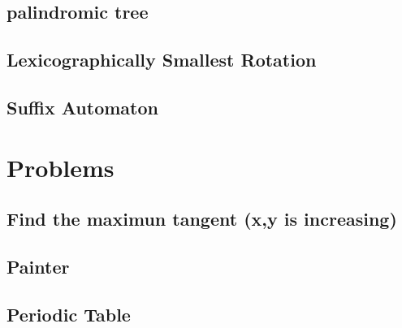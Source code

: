 \documentclass[10pt,twocolumn,oneside]{article}
\begin{document}
\subsection{palindromic tree}


\subsection{Lexicographically Smallest Rotation}


\subsection{Suffix Automaton}


\newpage

\section{Problems}
%

\subsection{Find the maximun tangent (x,y is increasing)}


%

%

\subsection{Painter}


\clearpage

\subsection{Periodic Table}


%
\end{document}
